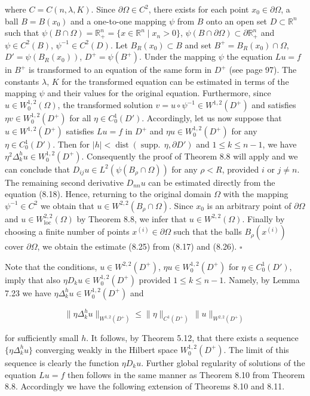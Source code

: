 where $C=C(n,\lambda,K)$. Since $\partial\Omega\in C^2$, there exists for each point
$x_0\in\partial\Omega$, a ball $B=B(x_0)$ and a one-to-one mapping $\psi$ from $B$
onto an open set $D\subset\mathbb R^n$ such that $\psi(B\cap\Omega)=\mathbb R_+^n=
\{x\in\mathbb R^n\mid x_n>0\}$, $\psi(B\cap\partial\Omega)\subset\partial\mathbb R_+^n$
and $\psi\in C^2(B)$, $\psi^{-1}\in C^2(D)$. Let $B_R(x_0)\subset B$ and set
$B^+=B_R(x_0)\cap\Omega$, $D'=\psi(B_R(x_0))$, $D^+=\psi(B^+)$. Under the mapping
$\psi$ the equation $Lu=f$ in $B^+$ is transformed to an equation of the same form
in $D^+$ (see page 97). The constants $\lambda$, $K$ for the transformed equation
can be estimated in terms of the mapping $\psi$ and their values for the original
equation. Furthermore, since $u\in W_0^{1,2}(\Omega)$, the transformed solution
$v=u\circ\psi^{-1}\in W^{1,2}(D^+)$ and satisfies $\eta v\in W_0^{1,2}(D^+)$ for
all $\eta\in C_0^1(D')$. Accordingly, let us now suppose that $u\in W^{1,2}(D^+)$
satisfies $Lu=f$ in $D^+$ and $\eta u\in W_0^{1,2}(D^+)$ for any $\eta\in C_0^1(D')$.
Then for $|h|<\operatorname{dist}(\operatorname{supp.}\,\eta,\partial D')$ and
$1\le k\le n-1$, we have $\eta^2\Delta_k^h u\in W_0^{1,2}(D^+)$. Consequently the
proof of Theorem 8.8 will apply and we can conclude that $D_{ij}u\in
L^2(\psi(B_\rho\cap\Omega))$ for any $\rho<R$, provided $i$ or $j\ne n$. The
remaining second derivative $D_{nn}u$ can be estimated directly from the equation
(8.18). Hence, returning to the original domain $\Omega$ with the mapping
$\psi^{-1}\in C^2$ we obtain that $u\in W^{2,2}(B_\rho\cap\Omega)$. Since $x_0$ is
an arbitrary point of $\partial\Omega$ and $u\in W^{2,2}_{\operatorname{loc}}(\Omega)$
by Theorem 8.8, we infer that $u\in W^{2,2}(\Omega)$. Finally by choosing a finite
number of points $x^{(i)}\in\partial\Omega$ such that the balls $B_\rho(x^{(i)})$
cover $\partial\Omega$, we obtain the estimate (8.25) from (8.17) and (8.26).
$\square$

Note that the conditions, $u\in W^{2,2}(D^+)$, $\eta u\in W_0^{1,2}(D^+)$ for
$\eta\in C_0^1(D')$, imply that also $\eta D_k u\in W_0^{1,2}(D^+)$ provided
$1\le k\le n-1$. Namely, by Lemma 7.23 we have $\eta \Delta_k^h u\in W_0^{1,2}(D^+)$
and

\[
\|\eta \Delta_k^h u\|_{W^{1,2}(D^+)}\le \|\eta\|_{C^1(D^+)}\,\|u\|_{W^{2,2}(D^+)}
\]

for sufficiently small $h$. It follows, by Theorem 5.12, that there exists a
sequence $\{\eta \Delta_k^h u\}$ converging weakly in the Hilbert space
$W_0^{1,2}(D^+)$. The limit of this sequence is clearly the function $\eta D_k u$.
Further global regularity of solutions of the equation $Lu=f$ then follows in the
same manner as Theorem 8.10 from Theorem 8.8. Accordingly we have the following
extension of Theorems 8.10 and 8.11.

